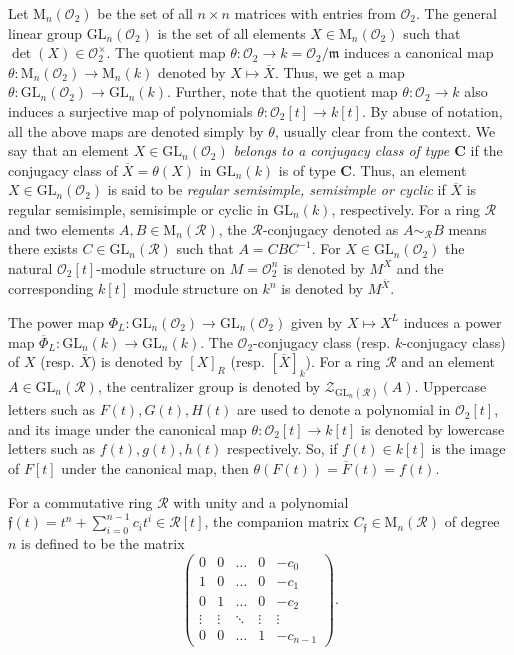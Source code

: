 \documentclass[11pt,twoside]{amsart}
\newcommand{\GL}{\mathrm{GL}}
\newcommand{\M}{\mathrm{M}}
\newcommand{\R}{\mathscr{O}_2}
\newcommand{\Zen}{\mathscr{Z}}
\theoremstyle{definition} %
\begin{document}
Let $\M_n(\R)$ be the set of all $n\times n$ matrices with entries from $\R$. The general linear group $\GL_n(\R)$ is the set of all elements $X\in \M_n(\R)$ such that $\det(X)\in \R^{\times}$. The quotient map $\theta\colon \R \rightarrow k =\R/ \mathfrak{m}$ induces a canonical map $\theta\colon \M_n(\R)\rightarrow \M_n(k)$ denoted by $X\mapsto \overline{X}$. Thus, we get a map $\theta\colon \GL_n(\R) \rightarrow \GL_n(k)$. Further, note that the quotient map $\theta\colon \R \rightarrow k$ also induces a surjective map of polynomials $\theta\colon \R[t]\rightarrow k[t]$. By abuse of notation, all the above maps are denoted simply by $\theta$, usually clear from the context. We say that an element $X\in \GL_n(\R)$ \emph{belongs to a conjugacy class of type $\mathbf{C}$} if the conjugacy class of $\overline{X} = \theta(X)$ in $\GL_n(k)$ is of type $\mathbf{C}$. Thus, an element $X\in \GL_n(\R)$ is said to be \emph{regular semisimple, semisimple or cyclic} if $\overline{X}$ is regular semisimple, semisimple or cyclic in $\GL_n(k)$, respectively. 
For a ring $\mathscr R$ and two elements $A, B\in\M_n(\mathscr R)$, the $\mathscr R$-conjugacy denoted as $A\sim_{\mathscr R} B$ means there exists $C\in\GL_n(\mathscr R)$ such that $A = CBC^{-1}$.
For $X\in\GL_n(\R)$ the natural $\R[t]$-module structure on $M = \R^n$ is denoted by $M^X$ and the corresponding $k[t]$ module structure on $k^n$ is denoted by ${M}^{\overline{X}}$. 

The power map $\Phi_L\colon \GL_n(\R) \rightarrow \GL_n(\R)$ given by  $X\mapsto X^L$ induces a power map $\overline{\Phi}_L\colon \GL_n(k) \rightarrow \GL_n(k)$. The $\R$-conjugacy class (resp. $k$-conjugacy class) of $X$ (resp. $\overline{X}$) is denoted  by $[X]_R$ (resp. $[\overline{X}]_k$). For a ring $\mathscr R$ and an element $A\in \GL_n(\mathscr R)$, the centralizer group is denoted by $\Zen_{\GL_n(\mathscr R)}(A)$. Uppercase letters such as $F(t), G(t), H(t)$ are used to denote a polynomial in $\R[t]$, and its image under the canonical map $\theta\colon \R[t]\rightarrow k[t]$ is denoted by lowercase letters such as $f(t), g(t), h(t)$ respectively.
So, if $f(t)\in k[t]$ is the image of $F[t]$ under the canonical map, then $\theta(F(t))= \overline{F}(t) =f(t)$.

For a commutative ring $\mathscr R$ with unity and a polynomial $\mathfrak f(t)=t^n+\sum\limits_{i=0}^{n-1} c_it^i\in \mathscr R[t]$, the companion matrix $C_{\mathfrak f}\in\M_n(\mathscr R)$ of degree $n$ is defined to be the matrix $$\begin{pmatrix}
    0 & 0 & \dots & 0 & -c_0 \\
1 & 0 & \dots & 0 & -c_1 \\
0 & 1 & \dots & 0 & -c_2 \\
\vdots & \vdots & \ddots & \vdots & \vdots \\
0 & 0 & \dots & 1 & -c_{n-1}
\end{pmatrix}.$$
\end{document}

